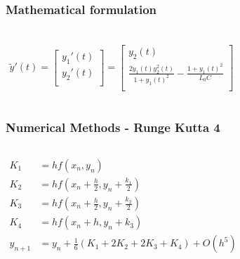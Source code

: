 \documentclass[aspectratio=1610]{beamer}
\begin{document}
\begin{frame}
\frametitle{Mathematical formulation}
\begin{columns}
\column{37em}
\huge
\begin{align*}\\
\tilde{y}'(t) =
\begin{bmatrix}
y_{1}'(t) \\ 
y_{2}'(t) \\
\end{bmatrix}
= \begin{bmatrix}
y_{2}(t)\\
\frac{2y_{1}(t)y_{2}^{2}(t)}{1+y_{1}(t)^2}-\frac{1+y_{1}(t)^{2}}{L_{0}C}\\
\end{bmatrix}
\end{align*}
\end{columns}
\end{frame}
\begin{frame}
\frametitle{Numerical Methods - Runge Kutta 4}
\begin{columns}
\column{2em}
\Large
  \begin{align*}
  K_{1}&=hf(x_{n},y_{n})\\
  K_{2}&=hf(x_{n}+\frac{h}{2},y_{n}+\frac{k_{1}}{2})\\
  K_{3}&=hf(x_{n}+\frac{h}{2},y_{n}+\frac{k_{2}}{2})\\
  K_{4}&=hf(x_{n}+h,y_{n}+k_{3})\\
  y_{n+1}&=y_{n}+\frac{1}{6}\left(K_{1}+2K_{2}+2K_{3}+K_{4}\right)+O(h^{5})
  \end{align*}
\end{columns}
\end{frame}
\end{document}
